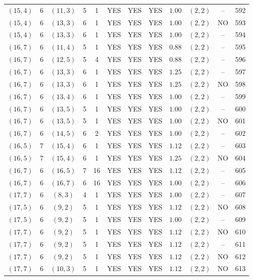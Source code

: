 \begin{longtable}{|c|c|c|c|c|c|c|c|c|c|c|c|}
$(15,4)$ & 6 & $(11,3)$ & 5 & 1 & YES & YES & YES & $1.00$ & $(2,2)$ & -- & 592\\
$(15,4)$ & 6 & $(13,3)$ & 6 & 1 & YES & YES & YES & $1.00$ & $(2,2)$ & NO & 593\\
$(15,4)$ & 6 & $(13,3)$ & 6 & 1 & YES & YES & YES & $1.00$ & $(2,2)$ & -- & 594\\
$(16,7)$ & 6 & $(11,4)$ & 5 & 1 & YES & YES & YES & $0.88$ & $(2,2)$ & -- & 595\\
$(16,7)$ & 6 & $(12,5)$ & 5 & 4 & YES & YES & YES & $0.88$ & $(2,2)$ & -- & 596\\
$(16,7)$ & 6 & $(13,3)$ & 6 & 1 & YES & YES & YES & $1.25$ & $(2,2)$ & -- & 597\\
$(16,7)$ & 6 & $(13,3)$ & 6 & 1 & YES & YES & YES & $1.25$ & $(2,2)$ & NO & 598\\
$(16,7)$ & 6 & $(13,4)$ & 6 & 1 & YES & YES & YES & $1.00$ & $(2,2)$ & -- & 599\\
$(16,7)$ & 6 & $(13,5)$ & 5 & 1 & YES & YES & YES & $1.00$ & $(2,2)$ & -- & 600\\
$(16,7)$ & 6 & $(13,5)$ & 5 & 1 & YES & YES & YES & $1.00$ & $(2,2)$ & NO & 601\\
$(16,7)$ & 6 & $(14,5)$ & 6 & 2 & YES & YES & YES & $1.00$ & $(2,2)$ & -- & 602\\
$(16,5)$ & 7 & $(15,4)$ & 6 & 1 & YES & YES & YES & $1.12$ & $(2,2)$ & -- & 603\\
$(16,5)$ & 7 & $(15,4)$ & 6 & 1 & YES & YES & YES & $1.25$ & $(2,2)$ & NO & 604\\
$(16,7)$ & 6 & $(16,5)$ & 7 & 16 & YES & YES & YES & $1.12$ & $(2,2)$ & -- & 605\\
$(16,7)$ & 6 & $(16,7)$ & 6 & 16 & YES & YES & YES & $1.00$ & $(2,2)$ & -- & 606\\
$(17,7)$ & 6 & $(8,3)$ & 4 & 1 & YES & YES & YES & $1.00$ & $(2,2)$ & -- & 607\\
$(17,5)$ & 6 & $(9,2)$ & 5 & 1 & YES & YES & YES & $1.12$ & $(2,2)$ & NO & 608\\
$(17,5)$ & 6 & $(9,2)$ & 5 & 1 & YES & YES & YES & $1.00$ & $(2,2)$ & -- & 609\\
$(17,7)$ & 6 & $(9,2)$ & 5 & 1 & YES & YES & YES & $1.12$ & $(2,2)$ & NO & 610\\
$(17,7)$ & 6 & $(9,2)$ & 5 & 1 & YES & YES & YES & $1.12$ & $(2,2)$ & -- & 611\\
$(17,7)$ & 6 & $(9,2)$ & 5 & 1 & YES & YES & YES & $1.12$ & $(2,2)$ & NO & 612\\
$(17,7)$ & 6 & $(10,3)$ & 5 & 1 & YES & YES & YES & $1.12$ & $(2,2)$ & NO & 613\\

\end{longtable}
